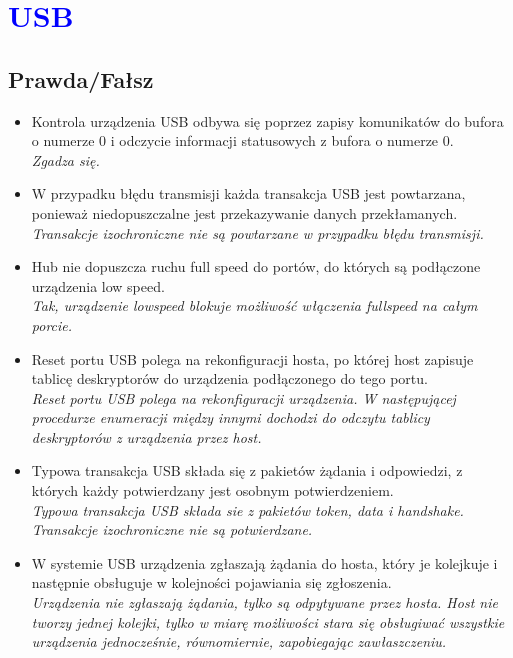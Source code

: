 \section{\textcolor{blue}{USB}}
\subsection*{Prawda/Fałsz}
\begin{itemize}
	
	\item \textcolor{tak}{Kontrola urządzenia USB odbywa się poprzez zapisy komunikatów do bufora o numerze 0 i odczycie informacji statusowych z bufora o numerze 0.} \\
	{\small \emph{Zgadza się.}}
	
	\item \textcolor{nie}{W przypadku błędu transmisji każda transakcja USB jest powtarzana, ponieważ niedopuszczalne jest przekazywanie danych przekłamanych.} \\
	{\small \emph{Transakcje izochroniczne nie są powtarzane w przypadku błędu transmisji.}}
	
	\item \textcolor{tak}{Hub nie dopuszcza ruchu full speed do portów, do których są podłączone urządzenia low speed.} \\
	{\small \emph{Tak, urządzenie lowspeed blokuje możliwość włączenia fullspeed na całym porcie.}}
	
	\item \textcolor{nie}{Reset portu USB polega na rekonfiguracji hosta, po której host zapisuje tablicę deskryptorów do urządzenia podłączonego do tego portu.} \\
	{\small \emph{Reset portu USB polega na rekonfiguracji urządzenia. W następującej procedurze enumeracji między innymi dochodzi do odczytu tablicy deskryptorów z urządzenia przez host.}}
	
	\item \textcolor{nie}{Typowa transakcja USB składa się z pakietów żądania i odpowiedzi, z których każdy potwierdzany jest osobnym potwierdzeniem.} \\
	{\small \emph{Typowa transakcja USB składa sie z pakietów token, data i handshake. Transakcje izochroniczne nie są potwierdzane.}}
	
	\item \textcolor{nie}{W systemie USB urządzenia zgłaszają żądania do hosta, który je kolejkuje i następnie obsługuje w kolejności pojawiania się zgłoszenia.} \\
	{\small \emph{Urządzenia nie zgłaszają żądania, tylko są odpytywane przez hosta. Host nie tworzy jednej kolejki, tylko w miarę możliwości stara się obsługiwać wszystkie urządzenia jednocześnie, równomiernie, zapobiegając zawłaszczeniu.}}
	

\end{itemize}
